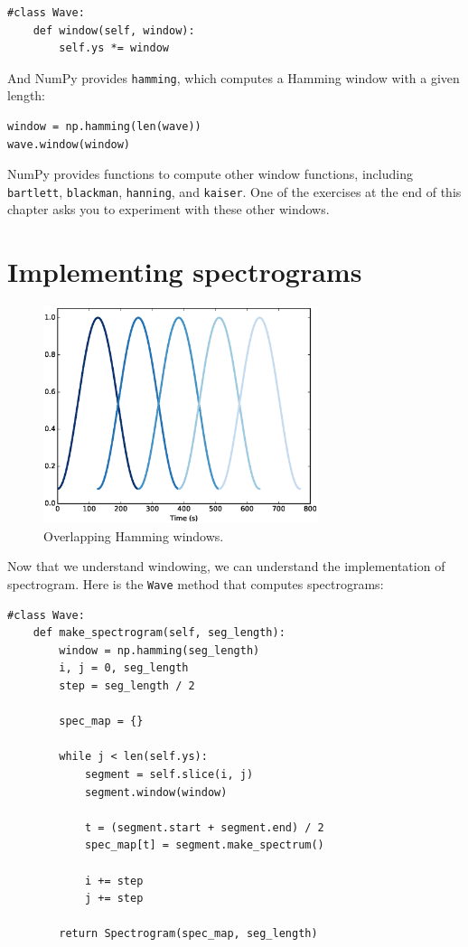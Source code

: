 \documentclass[12pt]{book}
\begin{document}
\begin{verbatim}
#class Wave:
    def window(self, window):
        self.ys *= window
\end{verbatim}

And NumPy provides {\tt hamming}, which computes a Hamming window
with a given length:

\begin{verbatim}
window = np.hamming(len(wave))
wave.window(window)
\end{verbatim}

NumPy provides functions to compute other window
functions, including {\tt bartlett}, {\tt blackman}, {\tt hanning},
and {\tt kaiser}.  One of the exercises at the end of this chapter
asks you to experiment with these other windows.


\section{Implementing spectrograms}

\begin{figure}
\centerline{\includegraphics[height=2.5in]{figs/windowing3.eps}}
\caption{Overlapping Hamming windows.}
\label{fig.windowing3}
\end{figure}

Now that we understand windowing, we can understand the
implementation of spectrogram.
Here is the {\tt Wave} method that computes spectrograms:

\begin{verbatim}
#class Wave:
    def make_spectrogram(self, seg_length):
        window = np.hamming(seg_length)
        i, j = 0, seg_length
        step = seg_length / 2

        spec_map = {}

        while j < len(self.ys):
            segment = self.slice(i, j)
            segment.window(window)

            t = (segment.start + segment.end) / 2
            spec_map[t] = segment.make_spectrum()

            i += step
            j += step

        return Spectrogram(spec_map, seg_length)
\end{verbatim}
\end{document}
